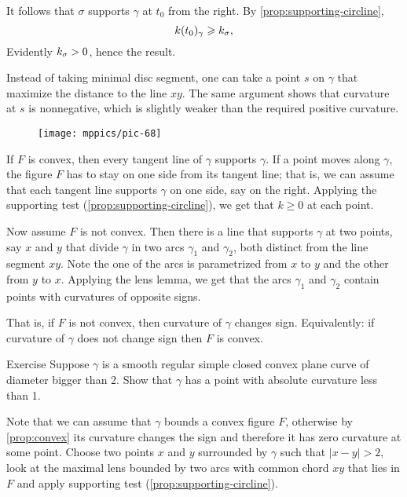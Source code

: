 It follows that $\sigma$ supports $\gamma$ at $t_0$ from the right.
By \ref{prop:supporting-circline}, 
\[k(t_0)_\gamma\geqslant k_\sigma,\]
Evidently $k_\sigma>0$, hence the result.
\qeds

Instead of taking minimal disc segment, one can take a point $s$ on $\gamma$ that maximize the distance to the line $xy$.
The same argument shows that curvature at $s$ is nonnegative, which is slightly weaker than the required positive curvature.

\begin{wrapfigure}{r}{35 mm}
\centering
\texttt{[image: mppics/pic-68]}
\vskip0mm
\end{wrapfigure}

If $F$ is convex, then every tangent line of $\gamma$ supports $\gamma$.
If a point moves along $\gamma$, the figure $F$ has to stay on one side from its tangent line;
that is, we can assume that each tangent line supports $\gamma$ on one side, say on the right.
Applying the supporting test (\ref{prop:supporting-circline}), we get that $k\ge 0$ at each point.

Now assume $F$ is not convex.
Then there is a line that supports $\gamma$ at two points, say $x$ and $y$ that divide $\gamma$ in two arcs $\gamma_1$ and $\gamma_2$, both distinct from the line segment $xy$.
Note the one of the arcs is parametrized from $x$ to $y$ and the other from $y$ to $x$.
Applying the lens lemma, we get that the arcs $\gamma_1$ and $\gamma_2$ contain points with curvatures of opposite signs.

That is, if $F$ is not convex, then curvature of $\gamma$ changes sign.
Equivalently: if curvature of $\gamma$ does not change sign then $F$ is convex.
\qeds

\begin{thm}{Exercise}\label{ex:convex small}
Suppose $\gamma$ is a smooth regular simple closed convex plane curve of diameter bigger than 2.
Show that $\gamma$ has a point with absolute curvature less than 1.
\end{thm}

Note that we can assume that $\gamma$ bounds a convex figure $F$, otherwise by \ref{prop:convex} its curvature changes the sign and therefore it has zero curvature at some point.
Choose two points $x$ and $y$ surrounded by $\gamma$ such that $|x-y|>2$,
look at the maximal lens bounded by two arcs with common chord $xy$ that lies in $F$ and apply supporting test (\ref{prop:supporting-circline}).

